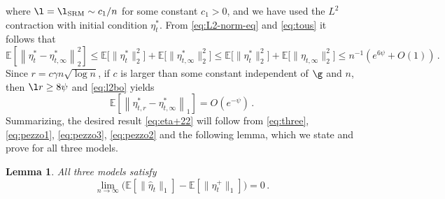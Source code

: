 \documentclass[11pt,reqno]{amsart}
\newtheorem{lemma}[theorem]{Lemma}
\theoremstyle{remark}
\theoremstyle{definition}
\numberwithin{equation}{section}
\numberwithin{figure}{section}
\newcommand{\E}{\mathds{E}}
\begin{document}
	where $\l=\l_{\rm SRM}\sim c_1/n$ for some constant $c_1>0$, and we have used the $L^2$ contraction
	with initial condition $\eta_{t}^*$. From \eqref{eq:L2-norm-eq} and \eqref{eq:tous} it follows that 
\begin{equation}
\E\left[\left\|\eta_{t}^*-\eta_{t,\infty}^*\right\|^2_2\right]	
\le \E\big[\|\eta_{t}^*\|_2^2\big]+\E\big[\|\eta_{t,\infty}^*\|_2^2\big]\le  \E\big[\|\eta_{t}^*\|_2^2\big]+\E\big[\|\eta_{t,\infty}\|_2^2\big]\le n^{-1}(e^{6\psi}+O(1))\,.
\end{equation}
Since $r=c\gamma n\sqrt{\log n}$, if $c$ is larger than some constant independent of $\g$ and $n$, then $\l r \ge 8\psi$ and \eqref{eq:l2bo} yields
\begin{equation}\label{eq:pezzo2}
		\E\left[\left\|\eta_{t,r}^*-\eta_{t,\infty}^*\right\|_1\right]
		 = O(e^{-\psi})\,.
	\end{equation}
Summarizing, the desired result \eqref{eq:eta+22}  will follow from \eqref{eq:three}, \eqref{eq:pezzo1}, \eqref{eq:pezzo3}, \eqref{eq:pezzo2} and the following lemma, which we state and prove for all three models.  
	\begin{lemma}\label{lemma:eta*B}
	All three models satisfy
		\begin{equation}\label{eq:topro}
			\lim_{n\to\infty}\big(\E[\|\widehat\eta_{t}\|_1]-\E[\|\eta^+_{t}\|_1]\big)=0\,.
		\end{equation}
	\end{lemma}
	
\end{document}
